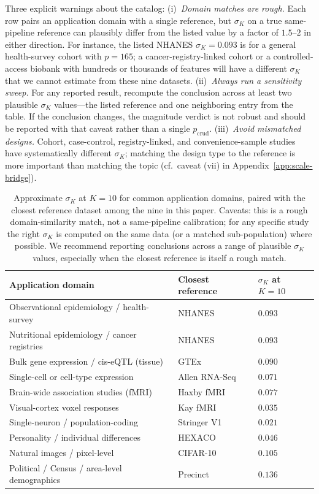 Three explicit warnings about the catalog: (i)~\emph{Domain matches are rough.} Each row pairs an application domain with a single reference, but $\sigma_K$ on a true same-pipeline reference can plausibly differ from the listed value by a factor of $1.5$--$2$ in either direction. For instance, the listed NHANES $\sigma_K=0.093$ is for a general health-survey cohort with $p=165$; a cancer-registry-linked cohort or a controlled-access biobank with hundreds or thousands of features will have a different $\sigma_K$ that we cannot estimate from these nine datasets. (ii)~\emph{Always run a sensitivity sweep.} For any reported result, recompute the conclusion across at least two plausible $\sigma_K$ values---the listed reference and one neighboring entry from the table. If the conclusion changes, the magnitude verdict is not robust and should be reported with that caveat rather than a single $p_{\mathrm{crud}}$. (iii)~\emph{Avoid mismatched designs.} Cohort, case-control, registry-linked, and convenience-sample studies have systematically different $\sigma_K$; matching the design type to the reference is more important than matching the topic (cf.\ caveat (vii) in Appendix~\ref{app:scale-bridge}).

\begin{table}[h]
\centering
\caption{Approximate $\sigma_K$ at $K=10$ for common application domains, paired with the closest reference dataset among the nine in this paper. Caveats: this is a rough domain-similarity match, not a same-pipeline calibration; for any specific study the right $\sigma_K$ is computed on the same data (or a matched sub-population) where possible. We recommend reporting conclusions across a range of plausible $\sigma_K$ values, especially when the closest reference is itself a rough match.}
\label{tab:reference-catalog}
\begin{tabular}{lll}
\toprule
Application domain & Closest reference & $\sigma_K$ at $K=10$ \\
\midrule
Observational epidemiology / health-survey  & NHANES        & $0.093$ \\
Nutritional epidemiology / cancer registries  & NHANES        & $0.093$ \\
Bulk gene expression / cis-eQTL (tissue)      & GTEx          & $0.090$ \\
Single-cell or cell-type expression           & Allen RNA-Seq & $0.071$ \\
Brain-wide association studies (fMRI)         & Haxby fMRI    & $0.077$ \\
Visual-cortex voxel responses                 & Kay fMRI      & $0.035$ \\
Single-neuron / population-coding             & Stringer V1   & $0.021$ \\
Personality / individual differences          & HEXACO        & $0.046$ \\
Natural images / pixel-level                  & CIFAR-10      & $0.105$ \\
Political / Census / area-level demographics  & Precinct      & $0.136$ \\
\bottomrule
\end{tabular}
\end{table}


